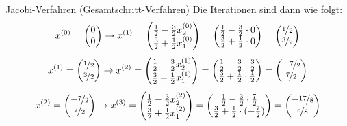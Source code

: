 \begin{example}{Jacobi-Verfahren (Gesamtschritt-Verfahren)}
    Die Iterationen sind dann wie folgt:
    \[
        x^{(0)} = \begin{pmatrix}
            0 \\
            0
        \end{pmatrix}
        \to
        x^{(1)} = \begin{pmatrix}
            \frac{1}{2} - \frac{3}{2}x_2^{(0)} \\
            \frac{3}{2} + \frac{1}{2}x_1^{(0)}
        \end{pmatrix}
        = \begin{pmatrix}
            \frac{1}{2} - \frac{3}{2} \cdot 0 \\
            \frac{3}{2} + \frac{1}{2} \cdot 0
        \end{pmatrix}
        = \begin{pmatrix}
            \nicefrac{1}{2} \\
            \nicefrac{3}{2}
        \end{pmatrix}
    \]
    \[
        x^{(1)} = \begin{pmatrix}
            \nicefrac{1}{2} \\
            \nicefrac{3}{2}
        \end{pmatrix}
        \to
        x^{(2)} = \begin{pmatrix}
            \frac{1}{2} - \frac{3}{2}x_2^{(1)} \\
            \frac{3}{2} + \frac{1}{2}x_1^{(1)}
        \end{pmatrix}
        = \begin{pmatrix}
            \frac{1}{2} - \frac{3}{2} \cdot \frac{3}{2} \\
            \frac{3}{2} + \frac{1}{2} \cdot \frac{1}{2}
        \end{pmatrix}
        = \begin{pmatrix}
            -\nicefrac{7}{2} \\
            \nicefrac{7}{2}
        \end{pmatrix}
    \]
    \[
        x^{(2)} = \begin{pmatrix}
            -\nicefrac{7}{2} \\
            \nicefrac{7}{2}
        \end{pmatrix}
        \to
        x^{(3)} = \begin{pmatrix}
            \frac{1}{2} - \frac{3}{2}x_2^{(2)} \\
            \frac{3}{2} + \frac{1}{2}x_1^{(2)}
        \end{pmatrix}
        = \begin{pmatrix}
            \frac{1}{2} - \frac{3}{2} \cdot \frac{7}{2} \\
            \frac{3}{2} + \frac{1}{2} \cdot (-\frac{7}{2})
        \end{pmatrix}
        = \begin{pmatrix}
            -\nicefrac{17}{8} \\
            \nicefrac{5}{8}
        \end{pmatrix}
    \]
\end{example}

